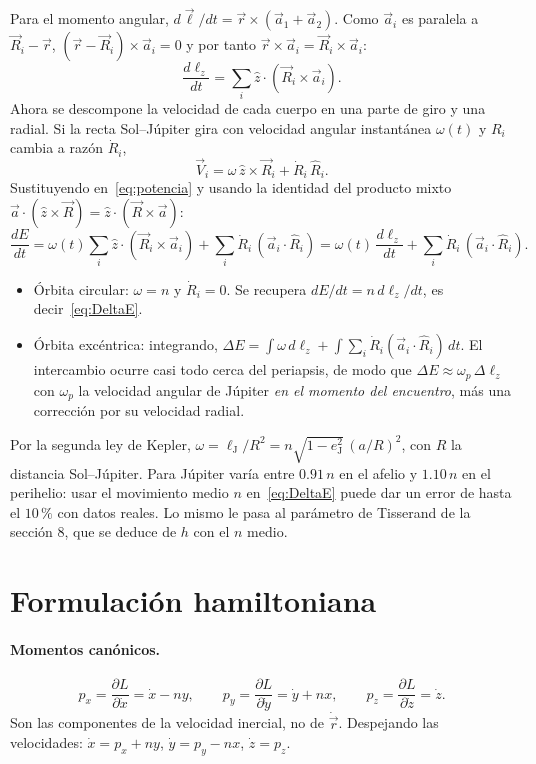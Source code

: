 \documentclass[12pt,letterpaper]{article}
\begin{document}
Para el momento angular, $d\vec\ell/dt = \vec r\times(\vec a_1 + \vec a_2)$. Como $\vec a_i$ es
paralela a $\vec R_i - \vec r$, $(\vec r - \vec R_i)\times\vec a_i = 0$ y por tanto
$\vec r\times\vec a_i = \vec R_i\times\vec a_i$:
\[
\frac{d\ell_z}{dt} = \sum_i \hat z\cdot(\vec R_i\times\vec a_i).
\]
Ahora se descompone la velocidad de cada cuerpo en una parte de giro y una radial. Si la recta
Sol--Júpiter gira con velocidad angular instantánea $\omega(t)$ y $R_i$ cambia a razón
$\dot R_i$,
\[
\vec V_i = \omega\,\hat z\times\vec R_i + \dot R_i\,\hat R_i .
\]
Sustituyendo en~\eqref{eq:potencia} y usando la identidad del producto mixto
$\vec a\cdot(\hat z\times\vec R) = \hat z\cdot(\vec R\times\vec a)$:
\begin{equation}
\frac{dE}{dt} = \omega(t)\sum_i \hat z\cdot(\vec R_i\times\vec a_i) + \sum_i \dot R_i\,(\vec a_i\cdot\hat R_i)
= \omega(t)\,\frac{d\ell_z}{dt} + \sum_i \dot R_i\,(\vec a_i\cdot\hat R_i).
\label{eq:excentrica}
\end{equation}
\begin{itemize}
\item Órbita circular: $\omega = n$ y $\dot R_i = 0$. Se recupera $dE/dt = n\,d\ell_z/dt$, es
decir~\eqref{eq:DeltaE}.
\item Órbita excéntrica: integrando,
$\Delta E = \int\omega\,d\ell_z + \int\sum_i \dot R_i(\vec a_i\cdot\hat R_i)\,dt$. El intercambio
ocurre casi todo cerca del periapsis, de modo que $\Delta E \approx \omega_p\,\Delta\ell_z$ con
$\omega_p$ la velocidad angular de Júpiter \emph{en el momento del encuentro}, más una corrección
por su velocidad radial.
\end{itemize}
Por la segunda ley de Kepler, $\omega = \ell_{\mathrm J}/R^2 = n\sqrt{1-e_{\mathrm J}^2}\,(a/R)^2$,
con $R$ la distancia Sol--Júpiter. Para Júpiter varía entre $0.91\,n$ en el afelio y $1.10\,n$ en
el perihelio: usar el movimiento medio $n$ en~\eqref{eq:DeltaE} puede dar un error de hasta el
$10\,\%$ con datos reales. Lo mismo le pasa al parámetro de Tisserand de la sección 8, que se
deduce de $h$ con el $n$ medio.

\section{Formulación hamiltoniana}

\paragraph{Momentos canónicos.}
\[
p_x = \frac{\partial L}{\partial\dot x} = \dot x - n y, \qquad
p_y = \frac{\partial L}{\partial\dot y} = \dot y + n x, \qquad
p_z = \frac{\partial L}{\partial\dot z} = \dot z .
\]
Son las componentes de la velocidad inercial, no de $\dot{\vec r}$. Despejando las velocidades:
$\dot x = p_x + n y$, $\dot y = p_y - n x$, $\dot z = p_z$.
\end{document}
